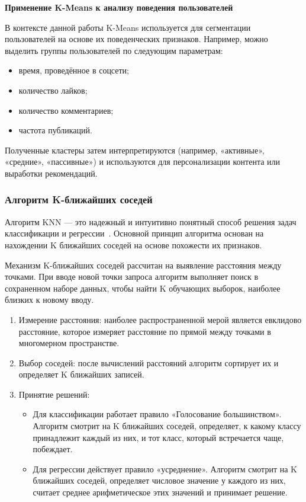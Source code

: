 \documentclass[14pt, a4paper]{extarticle}
\begin{document}
\textbf{Применение K-Means к анализу поведения пользователей}
\smallskip

В контексте данной работы K-Means используется для сегментации пользователей на основе их поведенческих признаков. Например, можно выделить группы пользователей по следующим параметрам:

\begin{itemize}
    \item время, проведённое в соцсети;
    \item количество лайков;
    \item количество комментариев;
    \item частота публикаций.
\end{itemize}

Полученные кластеры затем интерпретируются (например, «активные», «средние», «пассивные») и используются для персонализации контента или выработки рекомендаций.

\subsubsection{Алгоритм K-ближайших соседей}

Алгоритм KNN — это надежный и интуитивно понятный способ решения задач классификации и регрессии~\cite{knnbook}. Основной принцип алгоритма основан на нахождении K ближайших соседей на основе похожести их признаков.

Механизм K-ближайших соседей рассчитан на выявление расстояния между точками. При вводе новой точки запроса алгоритм выполняет поиск в сохраненном наборе данных, чтобы найти K обучающих выборок, наиболее близких к новому вводу.

\begin{enumerate}
    \item Измерение расстояния: наиболее распространенной мерой является евклидово расстояние, которое измеряет расстояние по прямой между точками в многомерном пространстве.
    
    \item Выбор соседей: после вычислений расстояний алгоритм сортирует их и определяет K ближайших записей.
    
    \item Принятие решений:
    \begin{itemize}
        \item Для классификации работает правило «Голосование большинством». Алгоритм смотрит на K ближайших соседей, определяет, к какому классу принадлежит каждый из них, и тот класс, который встречается чаще, побеждает.
        \item Для регрессии действует правило «усреднение». Алгоритм смотрит на K ближайших соседей, определяет числовое значение у каждого из них, считает среднее арифметическое этих значений и принимает решение.
    \end{itemize}
\end{enumerate}
\end{document}
